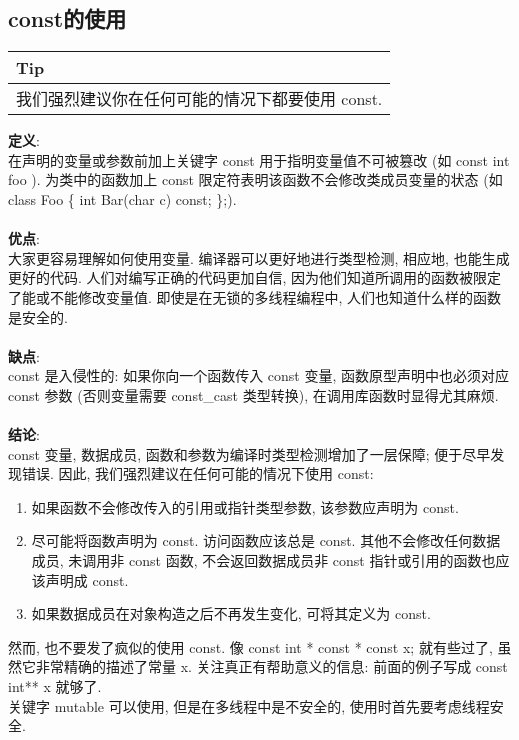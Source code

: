\documentclass[a4paper,11pt,CJK]{article}
\begin{document}
\begin{CJK}{UTF8}{gbsn}
\subsection{const的使用}
\begin{table}[htbp]
\flushleft
\begin{tabular}{p{400pt}}
\toprule
\rowcolor[gray]{.8} Tip \\
\midrule
我们强烈建议你在任何可能的情况下都要使用 const.\\
\bottomrule
\end{tabular}
\end{table}
\noindent
\textbf{定义}:\\
\indent 在声明的变量或参数前加上关键字 const 用于指明变量值不可被篡改 (如 const int foo ). 为类中的函数加上 const 限定符表明该函数不会修改类成员变量的状态 (如 class Foo \{ int Bar(char c) const; \};).\\
\\
\textbf{优点}:\\
\indent 大家更容易理解如何使用变量. 编译器可以更好地进行类型检测, 相应地, 也能生成更好的代码. 人们对编写正确的代码更加自信, 因为他们知道所调用的函数被限定了能或不能修改变量值. 即使是在无锁的多线程编程中, 人们也知道什么样的函数是安全的.\\
\\
\textbf{缺点}:\\
\indent const 是入侵性的: 如果你向一个函数传入 const 变量, 函数原型声明中也必须对应 const 参数 (否则变量需要 const\_cast 类型转换), 在调用库函数时显得尤其麻烦.\\
\\
\textbf{结论}:\\
\indent const 变量, 数据成员, 函数和参数为编译时类型检测增加了一层保障; 便于尽早发现错误. 因此, 我们强烈建议在任何可能的情况下使用 const:
\begin{enumerate}
\item
如果函数不会修改传入的引用或指针类型参数, 该参数应声明为 const.
\item
尽可能将函数声明为 const. 访问函数应该总是 const. 其他不会修改任何数据成员, 未调用非 const 函数, 不会返回数据成员非 const 指针或引用的函数也应该声明成 const.
\item
如果数据成员在对象构造之后不再发生变化, 可将其定义为 const.
\end{enumerate}
\indent 然而, 也不要发了疯似的使用 const. 像 const int * const * const x; 就有些过了, 虽然它非常精确的描述了常量 x. 关注真正有帮助意义的信息: 前面的例子写成 const int** x 就够了.\\
\indent 关键字 mutable 可以使用, 但是在多线程中是不安全的, 使用时首先要考虑线程安全.\\

\end{CJK}
\end{document}
